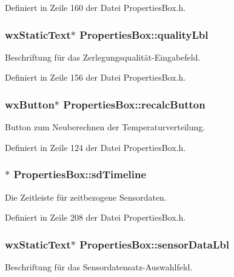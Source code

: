 Definiert in Zeile 160 der Datei Properties\-Box.\-h.

\hypertarget{classPropertiesBox_ad5339a1b07ae669a349478cf5c3b0fde}{
\subsubsection[{quality\-Lbl}]{\setlength{\rightskip}{0pt plus 5cm}wx\-Static\-Text$\ast$ Properties\-Box\-::quality\-Lbl\hspace{0.3cm}{\ttfamily [private]}}}\label{classPropertiesBox_ad5339a1b07ae669a349478cf5c3b0fde}
Beschriftung für das Zerlegungsqualität-\/\-Eingabefeld. 

Definiert in Zeile 156 der Datei Properties\-Box.\-h.

\hypertarget{classPropertiesBox_a0f5356371cde511efeb413bc2a98e6fc}{
\subsubsection[{recalc\-Button}]{\setlength{\rightskip}{0pt plus 5cm}wx\-Button$\ast$ Properties\-Box\-::recalc\-Button\hspace{0.3cm}{\ttfamily [private]}}}\label{classPropertiesBox_a0f5356371cde511efeb413bc2a98e6fc}
Button zum Neuberechnen der Temperaturverteilung. 

Definiert in Zeile 124 der Datei Properties\-Box.\-h.

\hypertarget{classPropertiesBox_ab145e0c36e99d355f2722964da46b31a}{
\subsubsection[{sd\-Timeline}]{$\ast$ Properties\-Box\-::sd\-Timeline\hspace{0.3cm}{\ttfamily [private]}}}\label{classPropertiesBox_ab145e0c36e99d355f2722964da46b31a}
Die Zeitleiste für zeitbezogene Sensordaten. 

Definiert in Zeile 208 der Datei Properties\-Box.\-h.

\hypertarget{classPropertiesBox_ab9b6df8a3367b4b5b56ef82ab1bd7aa3}{
\subsubsection[{sensor\-Data\-Lbl}]{\setlength{\rightskip}{0pt plus 5cm}wx\-Static\-Text$\ast$ Properties\-Box\-::sensor\-Data\-Lbl\hspace{0.3cm}{\ttfamily [private]}}}\label{classPropertiesBox_ab9b6df8a3367b4b5b56ef82ab1bd7aa3}
Beschriftung für das Sensordatensatz-\/\-Auswahlfeld. 

